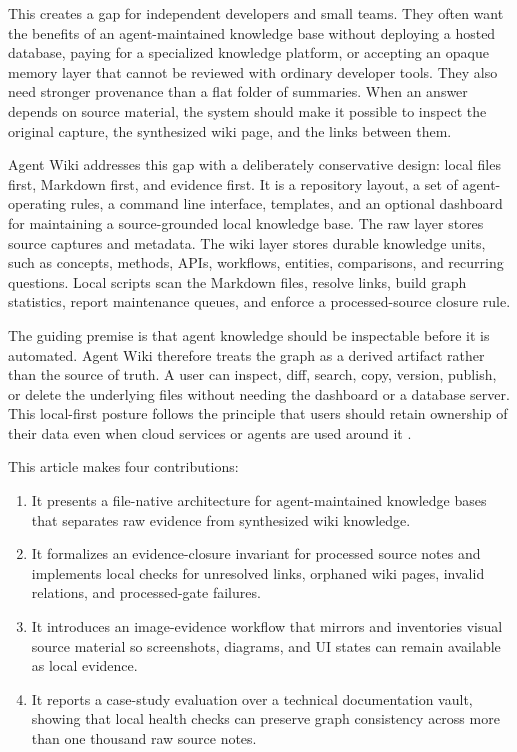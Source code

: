 \documentclass[11pt]{article}
\begin{document}
This creates a gap for independent developers and small teams. They often want
the benefits of an agent-maintained knowledge base without deploying a hosted
database, paying for a specialized knowledge platform, or accepting an opaque
memory layer that cannot be reviewed with ordinary developer tools. They also
need stronger provenance than a flat folder of summaries. When an answer
depends on source material, the system should make it possible to inspect the
original capture, the synthesized wiki page, and the links between them.

Agent Wiki addresses this gap with a deliberately conservative design: local
files first, Markdown first, and evidence first. It is a repository layout, a
set of agent-operating rules, a command line interface, templates, and an
optional dashboard for maintaining a source-grounded local knowledge base. The
raw layer stores source captures and metadata. The wiki layer stores durable
knowledge units, such as concepts, methods, APIs, workflows, entities,
comparisons, and recurring questions. Local scripts scan the Markdown files,
resolve links, build graph statistics, report maintenance queues, and enforce a
processed-source closure rule.

The guiding premise is that agent knowledge should be inspectable before it is
automated. Agent Wiki therefore treats the graph as a derived artifact rather
than the source of truth. A user can inspect, diff, search, copy, version,
publish, or delete the underlying files without needing the dashboard or a
database server. This local-first posture follows the principle that users
should retain ownership of their data even when cloud services or agents are
used around it \cite{kleppmann2019localfirst}.

This article makes four contributions:

\begin{enumerate}
  \item It presents a file-native architecture for agent-maintained knowledge
  bases that separates raw evidence from synthesized wiki knowledge.
  \item It formalizes an evidence-closure invariant for processed source notes
  and implements local checks for unresolved links, orphaned wiki pages,
  invalid relations, and processed-gate failures.
  \item It introduces an image-evidence workflow that mirrors and inventories
  visual source material so screenshots, diagrams, and UI states can remain
  available as local evidence.
  \item It reports a case-study evaluation over a technical documentation
  vault, showing that local health checks can preserve graph consistency across
  more than one thousand raw source notes.
\end{enumerate}
\end{document}
